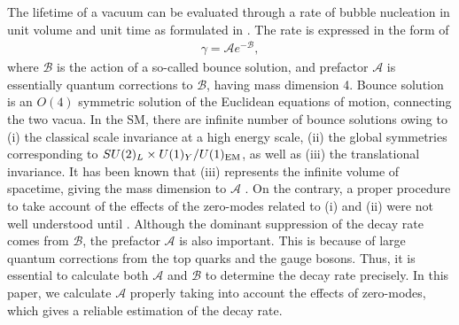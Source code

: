\documentclass[12pt]{article}
\begin{document}
The lifetime of a vacuum can be evaluated through a rate of bubble
nucleation in unit volume and unit time as formulated in
\cite{Coleman:1977py,Callan:1977pt}.  The rate is expressed in the
form of
\begin{align}
 \gamma = \mathcal Ae^{-\mathcal B},
\end{align}
where $\mathcal B$ is the action of a so-called bounce solution, and
prefactor $\mathcal A$ is essentially quantum corrections to $\mathcal
B$, having mass dimension 4.  Bounce solution is an $O(4)$ symmetric
solution of the Euclidean equations of motion, connecting the two
vacua. In the SM, there are infinite number of bounce solutions owing
to (i) the classical scale invariance at a high energy scale, (ii) the
global symmetries corresponding to $SU(2)_L\times U(1)_Y/U(1)_{\rm
  EM}$, as well as (iii) the translational invariance.  It has been
known that (iii) represents the infinite volume of spacetime, giving
the mass dimension to $\mathcal A$ \cite{Callan:1977pt}.  On the
contrary, a proper procedure to take account of the effects of the
zero-modes related to (i) and (ii) were not well understood until
\cite{Andreassen:2017rzq,Chigusa:2017dux}.  Although the dominant
suppression of the decay rate comes from $\mathcal B$, the prefactor
$\mathcal A$ is also important. This is because of large quantum
corrections from the top quarks and the gauge bosons. Thus, it is
essential to calculate both $\mathcal A$ and $\mathcal B$ to determine
the decay rate precisely.  In this paper, we calculate $\mathcal A$
properly taking into account the effects of zero-modes, which gives a
reliable estimation of the decay rate.
\end{document}
